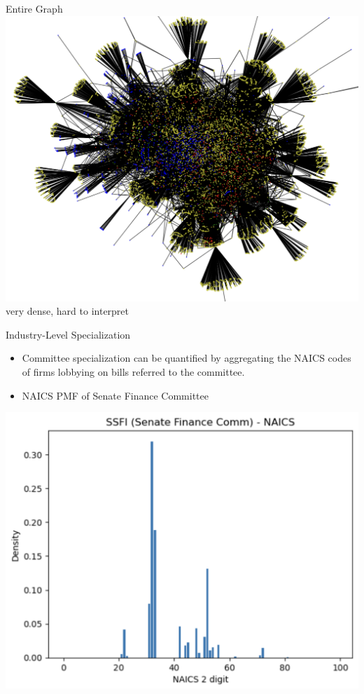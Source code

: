 \documentclass{beamer}
\begin{document}
	\begin{frame}{Entire Graph}
		\centering	\includegraphics[scale=0.3]{./images/graph.png}
		\\ very dense, hard to interpret
	\end{frame}



	\begin{frame}{Industry-Level Specialization}
		\begin{itemize}
			\item Committee specialization can be quantified by aggregating the NAICS codes of firms lobbying on bills referred to the committee.
			\item NAICS PMF of Senate Finance Committee
		\end{itemize}
		\centering	\includegraphics[scale=0.3]{./images/ssfi.png}
	\end{frame}
\end{document}
